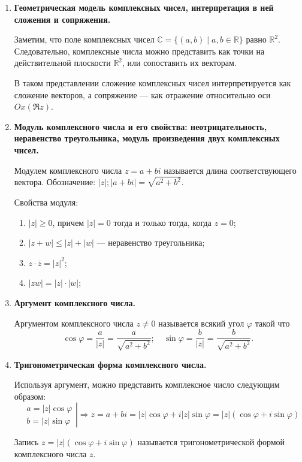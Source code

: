 \begin{enumerate}
\item \textbf{Геометрическая модель комплексных чисел, интерпретация в ней сложения и сопряжения.}

Заметим, что поле комплексных чисел $\mathbb{C} = \{(a, b) \mid a, b \in \mathbb{R}\}$ равно $\mathbb{R}^2$. Следовательно, комплексные числа можно представить как точки на действительной плоскости $\mathbb{R}^2$, или сопоставить их векторам.

В таком представлении сложение комплексных чисел интерпретируется как сложение векторов, а сопряжение — как отражение относительно оси $Ox (\Re z)$.

\item \textbf{Модуль комплексного числа и его свойства: неотрицательность, неравенство треугольника, модуль произведения двух комплексных чисел.}

Модулем комплексного числа $z = a + bi$ называется длина соответствующего вектора. Обозначение: $|z|; |a+bi| = \sqrt{a^2 + b^2}$.

Свойства модуля:
\begin{enumerate}
\item $|z| \geqslant 0$, причем $|z| = 0$ тогда и только тогда, когда $z = 0$;
\item $|z + w| \leqslant |z| + |w|$ — неравенство треугольника;
\item $z\cdot\overline{z} = |z|^2$;
\item $|zw| = |z| \cdot |w|$;
\end{enumerate}
\item \textbf{Аргумент комплексного числа.}

Аргументом комплексного числа $z \neq 0$  называется всякий угол $\varphi$ такой что 
\[
\cos \varphi = \frac{a}{|z|} = \frac{a}{\sqrt{a^2 + b^2}}; \quad \sin \varphi = \frac{b}{|z|} = \frac{b}{\sqrt{a^2 + b^2}}.
\]
\item \textbf{Тригонометрическая форма комплексного числа.}

Используя аргумент, можно представить комплексное число следующим образом:
\[
\left.
\begin{aligned}
&a = |z|\cos \varphi \\
&b = |z|\sin \varphi
\end{aligned} 
\right| \Rightarrow z = a + bi = |z| \cos \varphi + i |z| \sin \varphi = |z|(\cos\varphi + i\sin\varphi)
\] 

Запись $z = |z|(\cos\varphi + i\sin\varphi)$ называется тригонометрической формой \\ комплексного числа $z$.


\end{enumerate}
